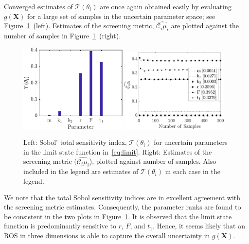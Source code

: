 Converged estimates of $\mathcal{T}(\theta_i)$ are once again obtained easily by
evaluating $g(\bm{X})$ for a large set of samples in the uncertain 
parameter space; see Figure~\ref{fig:sense_osc}~(left). Estimates of the screening metric, 
$\widehat{\mathcal{C}_i\mu_i}$ are plotted against the number of samples in 
Figure~\ref{fig:sense_osc}~(right). 
\begin{figure}[htbp]
 \begin{center}
  \includegraphics[width=0.48\textwidth]{./Figures/sense_oscillator}
  \includegraphics[width=0.48\textwidth]{./Figures/ub_conv_oscillator}
\caption{
Left: Sobol' total sensitivity index, $\mathcal{T}(\theta_i)$ for uncertain parameters in the limit 
state function in~\eqref{eq:limit}. Right: 
Estimates of the screening metric ($\widehat{\mathcal{C}_i\mu_i}$), plotted
against number of samples. Also included in the legend are estimates of $\mathcal{T}(\theta_i)$
in each case in the legend.}
\label{fig:sense_osc}
\end{center}
\end{figure}
We note that the total Sobol sensitivity indices are in excellent agreement
with the screening metric estimates. 
Consequently, the parameter ranks are found to be consistent in the
two plots in  
Figure~\ref{fig:sense_osc}.
It is observed that the limit state function is predominantly sensitive 
to $r$, $F$, and $t_1$. Hence, it seems likely that an ROS in
three dimensions is able to capture the overall uncertainty in $g(\bm{X})$.
